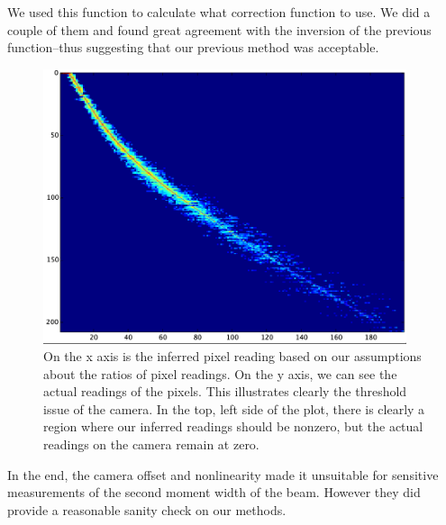 We used this function to calculate what correction function to use. We did a couple of them and found great agreement with the inversion of the previous function--thus suggesting that our previous method was acceptable. 


\begin{figure}
\centerline{
\includegraphics[width=0.95\textwidth]{cameraPixelFit}
}
\caption[Camera linearity and offset]{On the x axis is the inferred pixel reading based on our assumptions about the ratios of pixel readings. On the y axis, we can see the actual readings of the pixels. This illustrates clearly the threshold issue of the camera. In the top, left side of the plot, there is clearly a region where our inferred readings should be nonzero, but the actual readings on the camera remain at zero.\label{cameraPixelFit}}
\end{figure}

In the end, the camera offset and nonlinearity made it unsuitable for sensitive measurements of the second moment width of the beam. However they did provide a reasonable sanity check on our methods.
%
